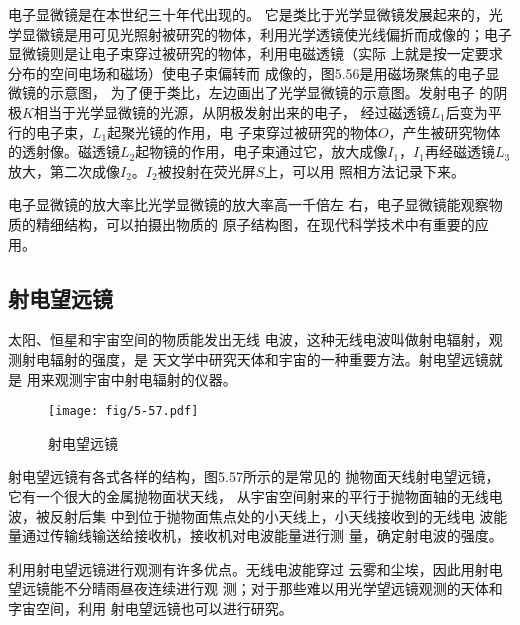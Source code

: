 电子显微镜是在本世纪三十年代出现的。
它是类比于光学显微镜发展起来的，光学显徽镜是用可见光照射被研究的物体，利用光学透镜使光线偏折而成像的；电子
显微镜则是让电子束穿过被研究的物体，利用电磁透镜（实际
上就是按一定要求分布的空间电场和磁场）使电子束偏转而
成像的，图5.56是用磁场聚焦的电子显微镜的示意图，
为了便于类比，左边画出了光学显微镜的示意图。发射电子
的阴极$K$相当于光学显微镜的光源，从阴极发射出来的电子，
经过磁透镜$L_1$后变为平行的电子束，$L_1$起聚光镜的作用，电
子束穿过被研究的物体$O$，产生被研究物体的透射像。磁透镜$L_2$起物镜的作用，电子束通过它，放大成像$I_1$，$I_1$再经磁透镜$L_3$放大，第二次成像$I_2$。$I_2$被投射在荧光屏$S$上，可以用
照相方法记录下来。


电子显微镜的放大率比光学显微镜的放大率高一千倍左
右，电子显微镜能观察物质的精细结构，可以拍摄出物质的
原子结构图，在现代科学技术中有重要的应用。

\subsection*{射电望远镜}
太阳、恒星和宇宙空间的物质能发出无线
电波，这种无线电波叫做射电辐射，观测射电辐射的强度，是
天文学中研究天体和宇宙的一种重要方法。射电望远镜就是
用来观测宇宙中射电辐射的仪器。
\begin{figure}[htp]\centering
    \texttt{[image: fig/5-57.pdf]}
    \caption{射电望远镜}
    \end{figure}

射电望远镜有各式各样的结构，图5.57所示的是常见的
抛物面天线射电望远镜，它有一个很大的金属抛物面状天线，
从宇宙空间射来的平行于抛物面轴的无线电波，被反射后集
中到位于抛物面焦点处的小天线上，小天线接收到的无线电
波能量通过传输线输送给接收机，接收机对电波能量进行测
量，确定射电波的强度。

利用射电望远镜进行观测有许多优点。无线电波能穿过
云雾和尘埃，因此用射电望远镜能不分晴雨昼夜连续进行观
测；对于那些难以用光学望远镜观测的天体和字宙空间，利用
射电望远镜也可以进行研究。

